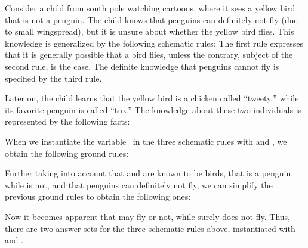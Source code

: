 \begin{example}\label{ex:flies}
Consider a child from south pole watching cartoons,
where it sees a yellow bird that is not a penguin.
The child knows that penguins can definitely not fly (due to small wingspread),
but it is unsure about whether the yellow bird flies.
This knowledge is generalized by
the following schematic rules:
%
%
The first rule expresses that it is generally possible that a bird flies,
unless the contrary, subject of the second rule, is the case.
The definite knowledge that penguins cannot fly
is specified by the third rule.

Later on, the child learns that the yellow bird
is a chicken called ``tweety,''
while its favorite penguin is called ``tux.''
The knowledge about these two individuals is
represented by the following facts:


When we instantiate the variable~ in the three schematic rules
with  and ,
we obtain the following ground rules:
%

%
Further taking into account that  and  are known to
be birds, that  is a penguin, while  is not, and that
penguins can definitely not fly,
we can simplify the previous ground rules to obtain the following ones:%
%

%
Now it becomes apparent that 
may fly or not, while  surely does not fly.
Thus, there are two answer sets for the three schematic rules above,
instantiated with  and .%
\eexample
\end{example}

